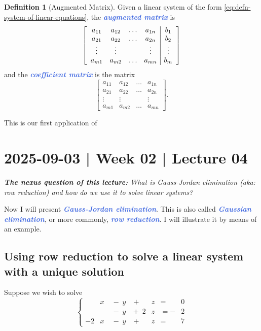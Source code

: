 \documentclass[10pt]{article}
\newcommand{\demph}[1]{\textcolor{RoyalBlue}{\textbf{\slshape #1}}} %
\newenvironment{augmentedmatrix}[1] %
{\left[\begin{array}{#1}}
    {\end{array}\right]}
\theoremstyle{definition}
\newtheorem{definition}[theorem]{Definition}
\begin{document}
\begin{definition}[Augmented Matrix]
  Given a linear system of the form \eqref{eq:defn-system-of-linear-equations},
  the \demph{augmented matrix} is
  \begin{equation*}
    \begin{augmentedmatrix}{cccc|c}
      a_{11}&a_{12}&\ldots& a_{1n}& b_{1}\\
      a_{21}&a_{22}&\ldots& a_{2n}& b_{2}\\
      \vdots &\vdots & &\vdots &\vdots \\
      a_{m1}&a_{m2}&\ldots& a_{mn}& b_{m}
    \end{augmentedmatrix}
  \end{equation*}
  and the \demph{coefficient matrix} is the matrix
  \begin{equation*}
    \begin{bmatrix}
      a_{11}&a_{12}&\ldots& a_{1n}\\
      a_{21}&a_{22}&\ldots& a_{2n}\\
      \vdots&\vdots & &\vdots \\
      a_{m1}&a_{m2}&\ldots& a_{mn}
    \end{bmatrix}.
  \end{equation*}
\end{definition}

This is our first application of 
\newpage
\section{2025-09-03 | Week 02 | Lecture 04}

\begin{center}
  \begin{tcolorbox}[width=0.9\textwidth, colback=white, colframe=black]
    \textit{\textbf{The nexus question of this lecture:} What is Gauss-Jordan
      elimination (aka: row reduction) and how do we use it to solve linear systems?}
  \end{tcolorbox}
\end{center}

Now I will present \demph{Gauss-Jordan elimination}. This is also called
\demph{Gaussian elimination}, or more commonly, \demph{row reduction}. I will
illustrate it by means of an example.

\subsection{Using row reduction to solve a linear system with a unique solution}
Suppose we wish to solve
\begin{equation}\label{eq:Gauss-Jordan-elimination-example}
  \left\{
    \begin{alignedat}{4}
      &x &{}\;-\; y &{}\;+\; &z{}&= &0 \\
      & &{}\;-\; y&{}+\; 2&z{}&= -&2 \\
      -2&x&{}\;-\; y&{}\;+\; &z {}&= &7
    \end{alignedat}
  \right.
\end{equation}
\end{document}
